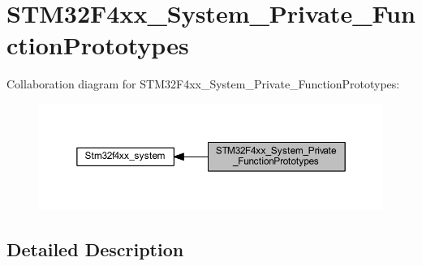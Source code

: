 \hypertarget{group___s_t_m32_f4xx___system___private___function_prototypes}{}\section{S\+T\+M32\+F4xx\+\_\+\+System\+\_\+\+Private\+\_\+\+Function\+Prototypes}
\label{group___s_t_m32_f4xx___system___private___function_prototypes}
Collaboration diagram for S\+T\+M32\+F4xx\+\_\+\+System\+\_\+\+Private\+\_\+\+Function\+Prototypes\+:
\nopagebreak
\begin{figure}[H]
\begin{center}
\leavevmode
\includegraphics[width=350pt]{group___s_t_m32_f4xx___system___private___function_prototypes}
\end{center}
\end{figure}


\subsection{Detailed Description}
